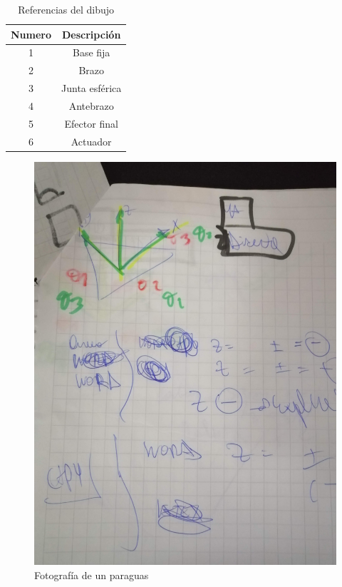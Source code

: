         \begin{table}[h]
            \centering
            \begin{tabular}{c c}
            \hline
                \textbf{Numero}& \textbf{Descripción} \\ 
            \hline             \hline
             1 & Base fija \\
            \hline
             2 & Brazo \\
            \hline
             3 & Junta esférica \\
            \hline
             4 & Antebrazo\\
            \hline
             5 & Efector final \\
             \hline
             6 & Actuador  \\
             \hline
            \end{tabular}
           \caption{Referencias del dibujo}
           \label{tab:cap4_tabla_1}
        \end{table}

        \newpage
        
        \begin{figure}[htb]
             \centering
             \includegraphics[width=0.6\linewidth]{Main/Chapter4/Images4/ma_direct.jpg}
              \caption{Fotografía de un paraguas}
              \label{f:Cap4_Metodo_A_Modelacion_Cinematica_Posicion_2}
        \end{figure}
        
